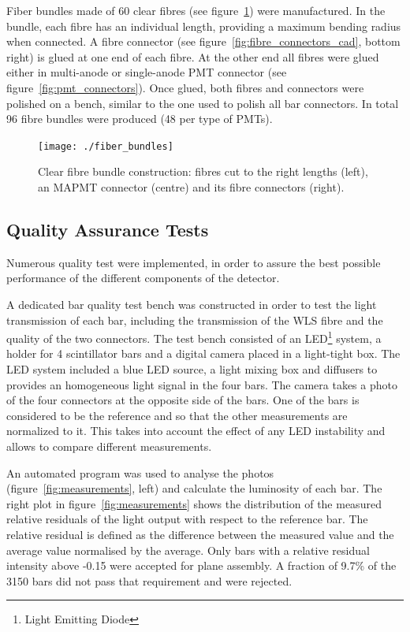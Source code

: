 \documentclass[a4paper,11pt]{article}
\begin{document}
Fiber bundles made of 60 clear fibres (see figure~\ref{fig:fibre_bundles}) were manufactured. In the bundle, each fibre has an individual length, providing
a maximum bending radius when connected. A fibre connector (see figure~\ref{fig:fibre_connectors_cad}, bottom right) is glued at one end of each fibre. At
the other end all fibres were glued either in multi-anode or single-anode PMT connector (see figure~\ref{fig:pmt_connectors}). Once glued, both fibres and
connectors were polished on a bench, similar to the one used to polish all bar connectors. In total 96 fibre bundles were produced (48 per type of PMTs).

\begin{figure}[htp!]
 \centering
 \texttt{[image: ./fiber\_bundles]}
 \caption[Clear fibre bundles]{Clear fibre bundle construction: fibres cut to the right lengths (left), an MAPMT connector (centre) and its fibre
 connectors (right).}
 \label{fig:fibre_bundles}
\end{figure}

\subsection{Quality Assurance Tests}\label{construction:subsec:quality_tests}

Numerous quality test were implemented, in order to assure the best possible performance of the different components of the detector. 

A dedicated bar quality test bench was constructed in order to test the light transmission of each bar, including the transmission of the WLS fibre and the
quality of the two connectors. The test bench consisted of an LED\footnote{Light Emitting Diode} system, a holder for 4 scintillator bars and a digital
camera placed in a light-tight box. The LED system included a blue LED source, a light mixing box and diffusers to provides an homogeneous light signal
in the four bars. The camera takes a photo of the four connectors at the opposite side of the bars. One of the bars is considered to be the reference and
so that the other measurements are normalized to it. This takes into account the effect of any LED instability and allows to compare different measurements. 

An automated program was used to analyse the photos (figure~\ref{fig:measurements}, left) and calculate the luminosity of each bar. The right plot in
figure~\ref{fig:measurements} shows the distribution of the measured relative residuals of the light output with respect to the reference bar. The relative
residual is defined as the difference between the measured value and the average value normalised by the average. Only bars with a relative residual
intensity above -0.15 were accepted for plane assembly. A fraction of 9.7\% of the 3150 bars did not pass that requirement and were rejected.
\end{document}
